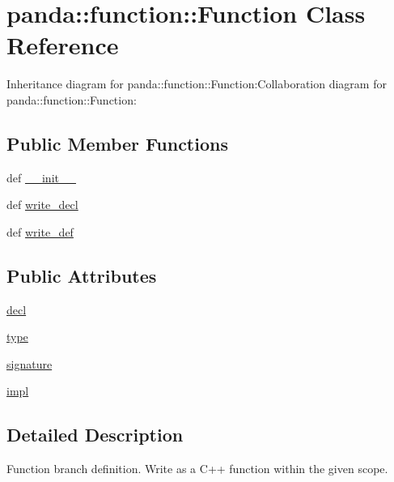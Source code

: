 \hypertarget{classpanda_1_1function_1_1Function}{
\section{panda::function::Function Class Reference}
\label{classpanda_1_1function_1_1Function}
}
Inheritance diagram for panda::function::Function:Collaboration diagram for panda::function::Function:\subsection*{Public Member Functions}
\begin{DoxyCompactItemize}
\item 
def \hyperlink{classpanda_1_1function_1_1Function_ab05763e0a9f1cad4448e3a25b8eeb5ea}{\_\-\_\-init\_\-\_\-}
\item 
def \hyperlink{classpanda_1_1function_1_1Function_a9edad45bf9b4b97213cf4a3c672fbfe1}{write\_\-decl}
\item 
def \hyperlink{classpanda_1_1function_1_1Function_a3e2c8cb654f087fa2e3efc6788b694b2}{write\_\-def}
\end{DoxyCompactItemize}
\subsection*{Public Attributes}
\begin{DoxyCompactItemize}
\item 
\hyperlink{classpanda_1_1function_1_1Function_a41721e8ad770c31fe57ca539d7e86c0f}{decl}
\item 
\hyperlink{classpanda_1_1function_1_1Function_a4e678691fa29ee9d368c5b540063b7d5}{type}
\item 
\hyperlink{classpanda_1_1function_1_1Function_a3653699eea04738356e185a13543343d}{signature}
\item 
\hyperlink{classpanda_1_1function_1_1Function_ac364ad85fc00826f97f453b544f14065}{impl}
\end{DoxyCompactItemize}


\subsection{Detailed Description}
\begin{DoxyVerb}
Function branch definition. Write as a C++ function within the given scope.
\end{DoxyVerb}
 

